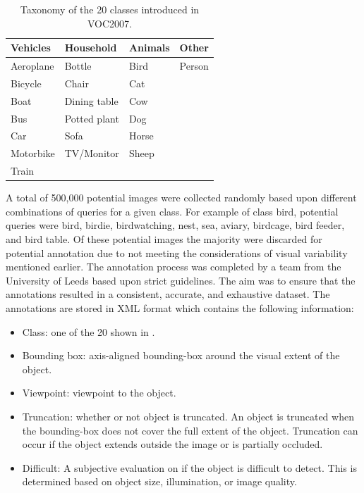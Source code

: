 \begin{table}[h]
\centering
\caption{Taxonomy of the 20 classes introduced in VOC2007.}
\label{tab:vocclasses}
\begin{tabular}{llll}
\hline
Vehicles & Household & Animals & Other \\ \hline
Aeroplane                      & Bottle                         & Bird                         & Person                     \\
Bicycle                        & Chair                          & Cat                          &                            \\
Boat                           & Dining table                   & Cow                          &                            \\
Bus                            & Potted plant                   & Dog                          &                            \\
Car                            & Sofa                           & Horse                        &                            \\
Motorbike                      & TV/Monitor                     & Sheep                        &                            \\ \hline
Train    &  &  &  \\ \hline
\end{tabular}
\end{table}

A total of 500,000 potential images were collected randomly based upon different combinations of queries for a given class. For example of class bird, potential queries were bird, birdie, birdwatching, nest, sea, aviary, birdcage, bird feeder, and bird table. Of these potential images the majority were discarded for potential annotation due to not meeting the considerations of visual variability mentioned earlier. The annotation process was completed by a team from the University of Leeds based upon strict guidelines. The aim was to ensure that the annotations resulted in a consistent, accurate, and exhaustive dataset. The annotations are stored in XML format which contains the following information:

\begin{itemize}
	\item Class: one of the 20 shown in .
	\item Bounding box: axis-aligned bounding-box around the visual extent of the object.
	\item Viewpoint: viewpoint to the object.
	\item Truncation: whether or not object is truncated. An object is truncated when the bounding-box does not cover the full extent of the object. Truncation can occur if the object extends outside the image or is partially occluded.
	\item Difficult: A subjective evaluation on if the object is difficult to detect. This is determined based on object size, illumination, or image quality.
\end{itemize}

